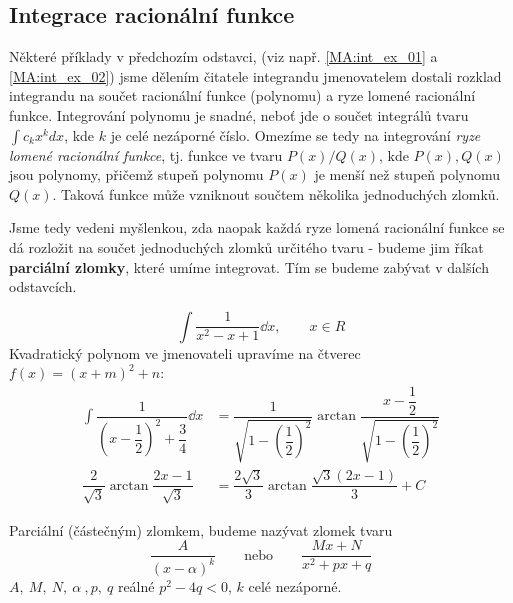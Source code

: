     \subsection{Integrace racionální funkce}
      Některé příklady v předchozím odstavci, (viz např. \ref{MA:int_ex_01} a 
      \ref{MA:int_ex_02}) jsme dělením čitatele integrandu jmenovatelem dostali rozklad
      integrandu na součet racionální funkce (polynomu) a ryze lomené racionální funkce.
      Integrování polynomu je snadné, neboť jde o součet integrálů tvaru $\int c_kx^k dx$, kde
      $k$ je celé nezáporné číslo. Omezíme se tedy na integrování \emph{ryze lomené racionální
      funkce},  tj. funkce ve tvaru $P(x)/Q(x)$, kde $P(x), Q(x)$ jsou polynomy, přičemž stupeň
      polynomu $P(x)$ je menší než stupeň polynomu $Q(x)$. Taková funkce může vzniknout součtem
      několika jednoduchých zlomků.
      
      
      
      Jsme tedy vedeni myšlenkou, zda naopak každá ryze lomená racionální funkce se dá rozložit
      na součet jednoduchých zlomků určitého tvaru - budeme jim říkat \textbf{parciální zlomky},
      které umíme integrovat. Tím se budeme zabývat v dalších odstavcích. 
            
      \begin{example}
        \begin{equation}
          \int\frac{1}{x^2 - x + 1}\dd{x}, \qquad x\in R
        \end{equation}
        Kvadratický polynom ve jmenovateli upravíme na čtverec $f(x) = (x + m)^2 + n$:
        \begin{align*}
          \int\dfrac{1}{\left(x-\dfrac{1}{2}\right)^2+\dfrac{3}{4}}\dd{x}   &=
            \dfrac{1}{\sqrt{1-\left(\dfrac{1}{2}\right)^2}}\arctan
            \dfrac{x-\dfrac{1}{2}}{\sqrt{1-\left(\dfrac{1}{2}\right)^2}}                       \\
          \dfrac{2}{\sqrt{3}}\arctan\dfrac{2x-1}{\sqrt{3}}               &=
            \dfrac{2\sqrt{3}}{3}\arctan\dfrac{\sqrt{3}(2x-1)}{3} + C
        \end{align*}
      \end{example}     
      
      \begin{definition} Parciální (částečným) zlomkem, budeme nazývat zlomek tvaru
         \begin{equation}
            \frac{A}{(x-\alpha)^k} \qquad\text{nebo}\qquad\frac{Mx + N}{x^2 + px +q}
         \end{equation}  
         $A,\ M,\ N,\ \alpha\ , p,\ q$ reálné $p^2-4q < 0$, $k$ celé nezáporné.         
      \end{definition}
      
